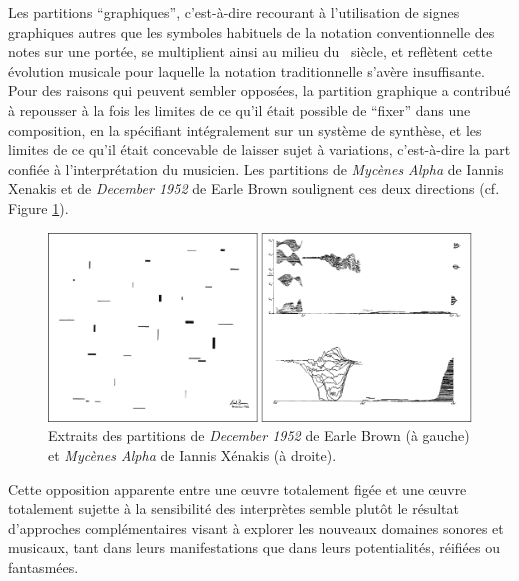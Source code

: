 \indent Les partitions ``graphiques'', c'est-à-dire recourant à l'utilisation de signes graphiques autres que les symboles habituels de la notation conventionnelle des notes sur une portée, se multiplient ainsi au milieu du ~siècle, et reflètent cette évolution musicale pour laquelle la notation traditionnelle s'avère insuffisante. Pour des raisons qui peuvent sembler opposées, la partition graphique a contribué à repousser à la fois les limites de ce qu'il était possible de ``fixer'' dans une composition, en la spécifiant intégralement sur un système de synthèse, et les limites de ce qu'il était concevable de laisser sujet à variations, c'est-à-dire la part confiée à l'interprétation du musicien. Les partitions de \textit{Mycènes Alpha} de Iannis Xenakis et de \textit{December 1952} de Earle Brown  soulignent ces deux directions (cf. Figure \ref{fig:notation:brown-xenakis}).
\begin{figure}[!htbp]
	\captionsetup{format=plain}
	\includegraphics[width=\textwidth]{gfx/notation/Brown-Xenakis-Paysage.png}
	\caption[Partitions de \textit{December 1952} et \textit{Mycènes Alpha} (extraits)]{Extraits des partitions de \textit{December 1952} de Earle Brown (à gauche) et \textit{Mycènes Alpha} de Iannis Xénakis (à droite).}
	\label{fig:notation:brown-xenakis}
\end{figure}

\noindent Cette opposition apparente entre une œuvre totalement figée et une œuvre totalement sujette à la sensibilité des interprètes semble plutôt le résultat d'approches complémentaires visant à explorer les nouveaux domaines sonores et musicaux, tant dans leurs manifestations que dans leurs potentialités, réifiées ou fantasmées.

